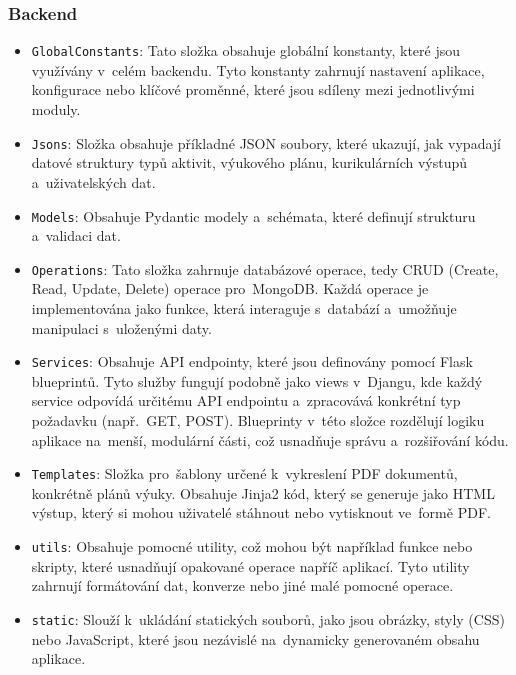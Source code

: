 \documentclass[male,czech,api_bc]{kitheses}
\begin{document}
\subsubsection{Backend}
\begin{itemize}
	\item \texttt{GlobalConstants}: Tato složka obsahuje globální konstanty, které jsou využívány v~celém backendu. Tyto konstanty zahrnují nastavení aplikace, konfigurace nebo klíčové proměnné, které jsou sdíleny mezi jednotlivými moduly.
	\item \texttt{Jsons}: Složka obsahuje příkladné JSON soubory, které ukazují, jak vypadají datové struktury typů aktivit, výukového plánu, kurikulárních výstupů a~uživatelských dat.
	\item \texttt{Models}: Obsahuje Pydantic modely a~schémata, které definují strukturu a~validaci dat.
	\item \texttt{Operations}: Tato složka zahrnuje databázové operace, tedy CRUD (Create, Read, Update, Delete) operace pro~MongoDB. Každá operace je implementována jako funkce, která interaguje s~databází a~umožňuje manipulaci s~uloženými daty.
	\item \texttt{Services}: Obsahuje API endpointy, které jsou definovány pomocí Flask blueprintů. Tyto služby fungují podobně jako views v~Djangu, kde každý service odpovídá určitému API endpointu a~zpracovává konkrétní typ požadavku (např.~GET, POST). Blueprinty v~této složce rozdělují logiku aplikace na~menší, modulární části, což usnadňuje správu a~rozšiřování kódu.
	\item \texttt{Templates}: Složka pro~šablony určené k~vykreslení PDF dokumentů, konkrétně plánů výuky. Obsahuje Jinja2 kód, který se generuje jako HTML výstup, který si mohou uživatelé stáhnout nebo vytisknout ve~formě PDF.
	\item \texttt{utils}: Obsahuje pomocné utility, což mohou být například funkce nebo skripty, které usnadňují opakované operace napříč aplikací. Tyto utility zahrnují formátování dat, konverze nebo jiné malé pomocné operace.
	\item \texttt{static}: Slouží k~ukládání statických souborů, jako jsou obrázky, styly (CSS) nebo JavaScript, které jsou nezávislé na~dynamicky generovaném obsahu aplikace.
\end{itemize}
\end{document}
